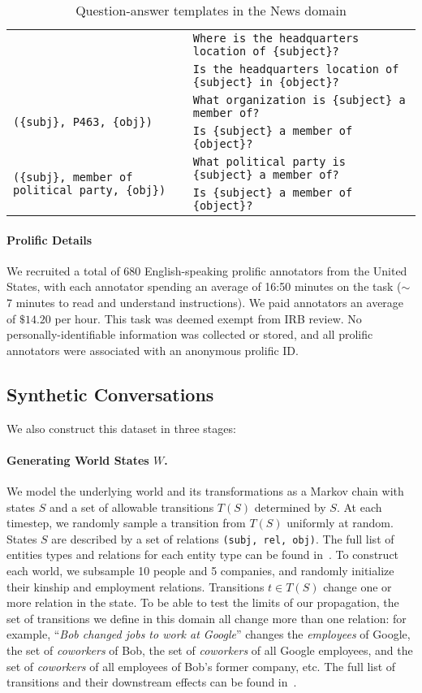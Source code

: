 \begin{table*}[]
\begin{tabular}{p{6cm}p{12cm}}
{} & \verb|Where is the headquarters location of {subject}?| \\
& \verb|Is the headquarters location of {subject} in {object}?| \\
\multirow{2}{6cm}{
    \texttt{(\{subj\}, P463, \{obj\})}
} & \verb|What organization is {subject} a member of?| \\
& \verb|Is {subject} a member of {object}?| \\
\multirow{2}{6cm}{
    \texttt{(\{subj\}, member of political party, \{obj\})}
} & \verb|What political party is {subject} a member of?| \\
& \verb|Is {subject} a member of {object}?| \\
    \end{tabular}
    \caption{Question-answer templates in the News domain}
    \label{tab:wiki_qs_templates}
\end{table*}


\paragraph{Prolific Details}


We recruited a total of 680 English-speaking prolific annotators from the United States, with each annotator spending an average of 16:50 minutes on the task ($\sim$ 7 minutes to read and understand instructions). We paid annotators an average of $\$14.20$ per hour.
This task was deemed exempt from IRB review.
No personally-identifiable information was collected or stored, and all prolific annotators were associated with an anonymous prolific ID.


\subsection{Synthetic Conversations}
\label{app:convos}
We also construct this dataset in three stages:
\paragraph{Generating World States $W$.} We model the underlying world and its transformations as a Markov chain with states $S$ and a set of allowable transitions $T(S)$ determined by $S$. At each timestep, we randomly sample a transition from $T(S)$ uniformly at random.
States $S$ are described by a set of relations \verb|(subj, rel, obj)|. 
The full list of entities types and relations for each entity type can be found in~. To construct each world, we subsample 10 people and 5 companies, and randomly initialize their kinship and employment relations.
Transitions $t\in T(S)$ change one or more relation in the state. To be able to test the limits of our propagation, the set of transitions we define in this domain all change more than one relation: for example, ``\textit{Bob changed jobs to work at Google}'' changes the \textit{employees} of Google, the set of \textit{coworkers} of Bob, the set of \textit{coworkers} of all Google employees, and the set of \textit{coworkers} of all employees of Bob's former company, etc. The full list of transitions and their downstream effects can be found in~.

